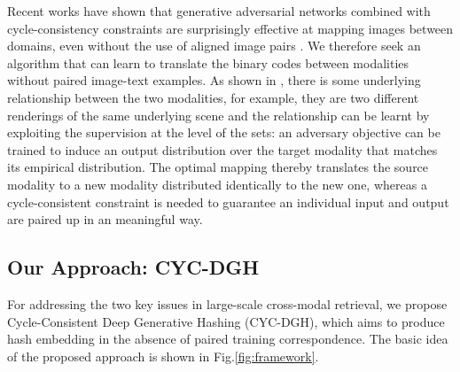 \documentclass[10pt,journal,twocolumn]{IEEEtran}
\begin{document}
Recent works have shown that generative adversarial networks combined with cycle-consistency constraints are surprisingly effective at mapping images between domains, even without the use of aligned image pairs \cite{CycleGAN,CyCADA}. We therefore seek an algorithm that can learn to translate the binary codes between modalities without paired image-text examples. As shown in \cite{CycleGAN}, there is some underlying relationship between the two modalities, for example, they are two different renderings of the same underlying scene and the relationship can be learnt by exploiting the supervision at the level of the sets: an adversary objective can be trained to induce an output distribution over the target modality that matches its empirical distribution. The optimal mapping thereby translates the source modality to a new modality distributed identically to the new one, whereas a cycle-consistent constraint is needed to guarantee an individual input and output are paired up in an meaningful way.


\subsection{Our Approach: CYC-DGH}

For addressing the two key issues in large-scale cross-modal retrieval, we propose Cycle-Consistent Deep Generative Hashing (CYC-DGH), which aims to produce hash embedding in the absence of paired training correspondence. The basic idea of the proposed approach is shown in Fig.\ref{fig:framework}.
\end{document}
